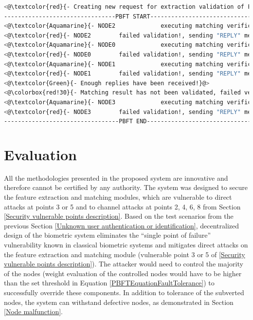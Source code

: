 \newpage
\begin{lstlisting}[language=bash,frame=single,breaklines={false}, caption={Terminal output for enrollment with one malfunctioning node.},captionpos=b, label={ChannelInterceptionTerminalOutput}]
<@\textcolor{red}{- Creating new request for extraction validation of FAILED verification!}@>
--------------------------------PBFT START---------------------------------
<@\textcolor{Aquamarine}{- NODE2			 executing matching verification}@>
<@\textcolor{red}{- NODE2 		 failed validation!, sending "REPLY" message!}@>
<@\textcolor{Aquamarine}{- NODE0			 executing matching verification}@>
<@\textcolor{red}{- NODE0 		 failed validation!, sending "REPLY" message!}@>
<@\textcolor{Aquamarine}{- NODE1			 executing matching verification}@>
<@\textcolor{red}{- NODE1 		 failed validation!, sending "REPLY" message!}@>
<@\textcolor{Green}{- Enough replies have been received!}@>
<@\colorbox{red!30}{- Matching result has not been validated, failed verification!}@>
<@\textcolor{Aquamarine}{- NODE3			 executing matching verification}@>
<@\textcolor{red}{- NODE3 		 failed validation!, sending "REPLY" message!}@>
---------------------------------PBFT END----------------------------------
\end{lstlisting}
\section{Evaluation}
\label{Evaluation}
All the methodologies presented in the proposed system are innovative and therefore cannot be certified by any authority. The system was designed to secure the feature extraction and matching modules, which are vulnerable to direct attacks at points 3 or 5 and to channel attacks at points 2, 4, 6, 8 from Section \ref{Security vulnerable points description}. Based on the test scenarios from the previous Section \ref{Unknown user authentication or identification}, decentralized design of the biometric system eliminates the ``single point of failure'' vulnerability known in classical biometric systems and mitigates direct attacks on the feature extraction and matching module (vulnerable point 3 or 5 of \ref{Security vulnerable points description}). The attacker would need to control the majority of the nodes (weight evaluation of the controlled nodes would have to be higher than the set threshold in Equation \ref{PBFTEquationFaultTolerance}) to successfully override these components. In addition to tolerance of the subverted nodes, the system can withstand defective nodes, as demonstrated in Section \ref{Node malfunction}.

